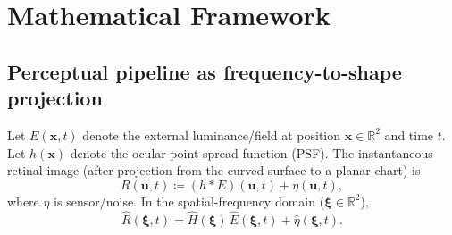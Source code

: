 \documentclass[12pt]{article}
\newcommand{\R}{\mathbb{R}}
\newcommand{\calA}{\mathcal{A}}      %
\begin{document}
\section{Mathematical Framework}\label{sec:math}
%
%
%
\subsection{Perceptual pipeline as frequency-to-shape projection}
Let $E(\mathbf{x},t)$ denote the external luminance/field at position $\mathbf{x}\in\R^2$ and time $t$. Let $h(\mathbf{x})$ denote the ocular point-spread function (PSF). The instantaneous retinal image (after projection from the curved surface to a planar chart) is
\begin{equation}
  R(\mathbf{u}, t) \coloneqq (h * E)(\mathbf{u}, t) + \eta(\mathbf{u}, t),
\end{equation}
where $\eta$ is sensor/noise. In the spatial-frequency domain ($\bm{\xi}\in\R^2$),
\begin{equation}
  \widehat{R}(\bm{\xi}, t) = \widehat{H}(\bm{\xi}) \, \widehat{E}(\bm{\xi}, t) + \widehat{\eta}(\bm{\xi}, t).
\end{equation}
\end{document}
